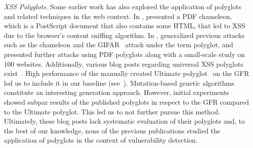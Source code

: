 \textit{XSS Polyglots.}
Some earlier work has also explored the application of polyglots and related techniques in the web context.
In \citeyear{barth2009secure}, \citet{barth2009secure} presented a PDF chameleon, which is a PostScript document that also contains some HTML, that led to XSS due to the browser's content sniffing algorithm.
In \citeyear{magazinius2013polyglots}, \citet{magazinius2013polyglots} generalized previous attacks such as the chameleon and the GIFAR~\cite{brandis2009exploring} attack under the term polyglot, and presented further attacks using PDF polyglots along with a small-scale study on 100 websites.
Additionally, various blog posts regarding universal XSS polyglots exist~\cite{ultimate-polyglot, szurek-polyglot, ostorlab-polyglot}.
High performance of the manually created Ultimate polyglot~\cite{ultimate-polyglot} on the GFR led us to include it in our baseline (see~).
Mutation-based genetic algorithms~\cite{ostorlab-polyglot} constitute an interesting generation approach.
However, initial experiments showed subpar results of the published polyglots in respect to the GFR compared to the Ultimate polyglot.
This led us to not further pursue this method.
Ultimately, these blog posts lack systematic evaluation of their polyglots and, to the best of our knowledge, none of the previous publications studied the application of polyglots in the context of \blindxss{} vulnerability detection. %




